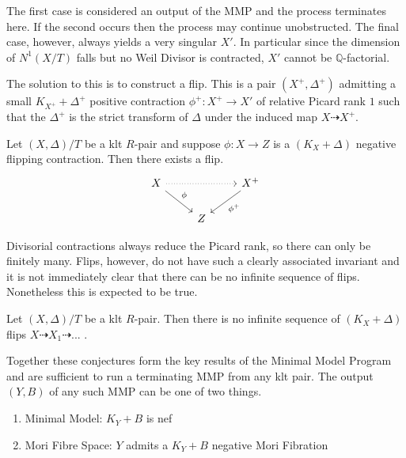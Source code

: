 \documentclass[a4paper,12pt]{book}
\begin{document}
The first case is considered an output of the MMP and the process terminates here. If the second occurs then the process may continue unobstructed. The final case, however, always yields a very singular $X'$. In particular since the dimension of $N^{1}(X/T)$ falls but no Weil Divisor is contracted, $X'$ cannot be $\mathbb{Q}$-factorial.

The solution to this is to construct a flip. This is a pair $(X^{+},\Delta^{+})$ admitting a small $K_{X^{+}} +\Delta^{+}$ positive contraction $\phi^{+}:X^{+} \to X'$ of relative Picard rank $1$ such that the $\Delta ^{+}$ is the strict transform of $\Delta$ under the induced map $X \dashrightarrow X^{+}$.

\begin{conjecture}\label{flips-conj}
	Let $(X,\Delta)/T$ be a klt $R$-pair and suppose $\phi:X \to Z$ is a $(K_{X}+\Delta)$ negative flipping contraction. Then there exists a flip. \[\begin{tikzcd}
	X \arrow[rr, dotted] \arrow[rd, "\phi"] &   & X^{+} \arrow[ld, "\phi^{+}"] \\
	& Z &                             
	\end{tikzcd}\]	
\end{conjecture}

Divisorial contractions always reduce the Picard rank, so there can only be finitely many. Flips, however, do not have such a clearly associated invariant and it is not immediately clear that there can be no infinite sequence of flips. Nonetheless this is expected to be true.

\begin{conjecture}
	
	Let $(X,\Delta)/T$ be a klt $R$-pair. Then there is no infinite sequence of $(K_{X}+\Delta)$ flips $X \dashrightarrow X_{1} \dashrightarrow ...$ .
	
	\end{conjecture}

Together these conjectures form the key results of the Minimal Model Program and are sufficient to run a terminating MMP from any klt pair. The output $(Y,B)$ of any such MMP can be one of two things.

\begin{enumerate}
	\item Minimal Model: $K_{Y}+B$ is nef
	\item Mori Fibre Space: $Y$ admits a $K_{Y}+B$ negative Mori Fibration
\end{enumerate}
\end{document}
